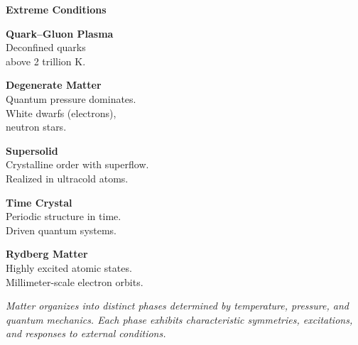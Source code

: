 \begin{tcolorbox}
\begin{multicols}{2}
\colorbox{blue!15}{\textbf{\large Extreme Conditions}}\vspace{3pt}

\textbf{Quark–Gluon Plasma}\\
{\footnotesize Deconfined quarks\\above 2 trillion K.}\vspace{6pt}

\textbf{Degenerate Matter}\\
{\footnotesize Quantum pressure dominates.\\White dwarfs (electrons),\\neutron stars.}\vspace{6pt}

\textbf{Supersolid}\\
{\footnotesize Crystalline order with superflow.\\Realized in ultracold atoms.}\vspace{6pt}

\textbf{Time Crystal}\\
{\footnotesize Periodic structure in time.\\Driven quantum systems.}\vspace{6pt}

\textbf{Rydberg Matter}\\
{\footnotesize Highly excited atomic states.\\Millimeter-scale electron orbits.}

\end{multicols}

\vspace{6pt}
{\footnotesize\color{blue!70}\textit{Matter organizes into distinct phases determined by temperature, pressure, and quantum mechanics. Each phase exhibits characteristic symmetries, excitations, and responses to external conditions.}}

\end{tcolorbox}
    